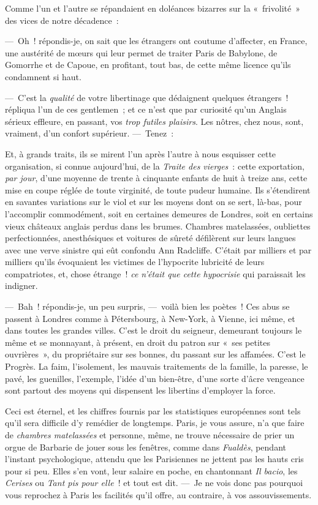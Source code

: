 \documentclass[french,twoside]{book} %
\begin{document}
Comme l’un et l’autre se répandaient en doléances bizarres sur la « frivolité » des vices de notre décadence :\par
— Oh ! répondis-je, on sait que les étrangers ont coutume d’affecter, en France, une austérité de mœurs qui leur permet de traiter Paris de Babylone, de Gomorrhe et de Capoue, en profitant, tout bas, de cette même licence qu’ils condamnent si haut.\par
— C’est la \emph{qualité} de votre libertinage que dédaignent quelques étrangers ! répliqua l’un de ces gentlemen ; et ce n’est que par curiosité qu’un Anglais sérieux effleure, en passant, vos \emph{trop futiles plaisirs}. Les nôtres, chez nous,   sont, vraiment, d’un confort supérieur. — Tenez :\par
Et, à grands traits, ils se mirent l’un après l’autre à nous esquisser cette organisation, si connue aujourd’hui, de la \emph{Traite des vierges} : cette exportation, \emph{par jour}, d’une moyenne de trente à cinquante enfants de huit à treize ans, cette mise en coupe réglée de toute virginité, de toute pudeur humaine. Ils s’étendirent en savantes variations sur le viol et sur les moyens dont on se sert, là-bas, pour l’accomplir commodément, soit en certaines demeures de Londres, soit en certains vieux châteaux anglais perdus dans les brumes. Chambres matelassées, oubliettes perfectionnées, anesthésiques et voitures de sûreté défilèrent sur leurs langues avec une verve sinistre qui eût confondu Ann Radcliffe. C’était par milliers et par milliers qu’ils évoquaient les victimes de l’hypocrite lubricité de leurs compatriotes, et, chose étrange ! \emph{ce n’était que cette hypocrisie} qui paraissait les indigner.\par
— Bah ! répondis-je, un peu surpris, — voilà bien les poètes ! Ces abus se passent à Londres   comme à Pétersbourg, à New-York, à Vienne, ici même, et dans toutes les grandes villes. C’est le droit du seigneur, demeurant toujours le même et se monnayant, à présent, en droit du patron sur « ses petites ouvrières », du propriétaire sur ses bonnes, du passant sur les affamées. C’est le Progrès. La faim, l’isolement, les mauvais traitements de la famille, la paresse, le pavé, les guenilles, l’exemple, l’idée d’un bien-être, d’une sorte d’âcre vengeance sont partout des moyens qui dispensent les libertins d’employer la force.\par
Ceci est éternel, et les chiffres fournis par les statistiques européennes sont tels qu’il sera difficile d’y remédier de longtemps. Paris, je vous assure, n’a que faire de \emph{chambres matelassées} et personne, même, ne trouve nécessaire de prier un orgue de Barbarie de jouer sous les fenêtres, comme dans \emph{Fualdès}, pendant l’instant psychologique, attendu que les Parisiennes ne jettent pas les hauts cris pour si peu. Elles s’en vont, leur salaire en poche, en chantonnant \emph{Il bacio}, les \emph{Cerises} ou \emph{Tant pis pour elle} ! et tout   est dit. — Je ne vois donc pas pourquoi vous reprochez à Paris les facilités qu’il offre, au contraire, à vos assouvissements.\par
\end{document}

